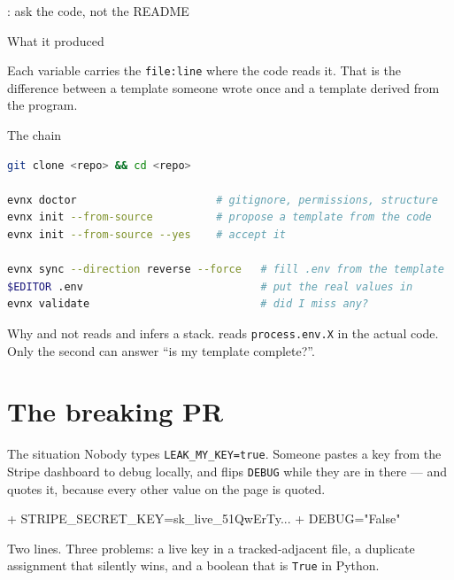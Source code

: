 \documentclass[aspectratio=169,10pt]{beamer}
\begin{document}
\begin{frame}[fragile]{: ask the code, not the README}
\end{frame}

\begin{frame}[fragile]{What it produced}

  {\footnotesize Each variable carries the \texttt{file:line} where the code
  reads it. That is the difference between a template someone wrote once and a
  template derived from the program.}
\end{frame}

\begin{frame}[fragile]{The chain}
\begin{lstlisting}[style=evnxcode,language=bash]
git clone <repo> && cd <repo>

evnx doctor                      # gitignore, permissions, structure
evnx init --from-source          # propose a template from the code
evnx init --from-source --yes    # accept it

evnx sync --direction reverse --force   # fill .env from the template
$EDITOR .env                            # put the real values in
evnx validate                           # did I miss any?
\end{lstlisting}

  \begin{block}{Why  and not }
     reads  and infers a stack.
     reads \texttt{process.env.X} in the actual code. Only
    the second can answer ``is my template complete?''.
  \end{block}
\end{frame}

\section{The breaking PR}

\begin{frame}[fragile]{The situation}
  Nobody types \texttt{LEAK\_MY\_KEY=true}. Someone pastes a key from the Stripe
  dashboard to debug locally, and flips \texttt{DEBUG} while they are in there
  --- and quotes it, because every other value on the page is quoted.

  \vspace{0.8em}
\begin{semiverbatim}\small
+ STRIPE_SECRET_KEY=sk_live_51QwErTy...
+ DEBUG="False"
\end{semiverbatim}

  \vspace{0.6em}
  {\footnotesize Two lines. Three problems: a live key in a tracked-adjacent
  file, a duplicate assignment that silently wins, and a boolean that is
  \texttt{True} in Python.}
\end{frame}
\end{document}
